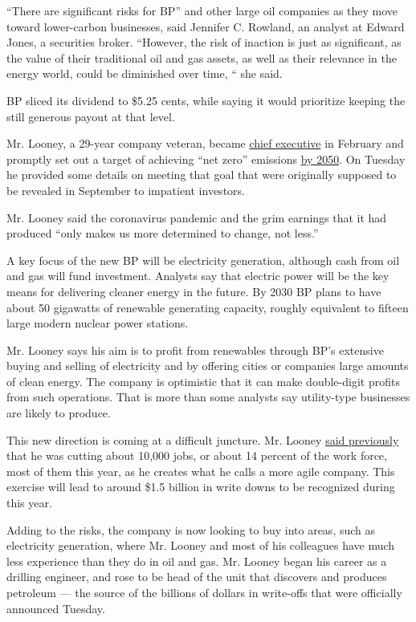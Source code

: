 ``There are significant risks for BP'' and other large oil companies as
they move toward lower-carbon businesses, said Jennifer C. Rowland, an
analyst at Edward Jones, a securities broker. ``However, the risk of
inaction is just as significant, as the value of their traditional oil
and gas assets, as well as their relevance in the energy world, could be
diminished over time, `` she said.

BP sliced its dividend to \$5.25 cents, while saying it would prioritize
keeping the still generous payout at that level.

Mr. Looney, a 29-year company veteran, became
\href{https://www.nytimes.com/2019/10/04/business/bp-ceo-bob-dudley-bernard-looney.html}{chief
executive} in February and promptly set out a target of achieving ``net
zero'' emissions
\href{https://www.nytimes.com/2020/02/12/climate/bp-greenhouse-gas-emissions.html}{by
2050}. On Tuesday he provided some details on meeting that goal that
were originally supposed to be revealed in September to impatient
investors.

Mr. Looney said the coronavirus pandemic and the grim earnings that it
had produced ``only makes us more determined to change, not less.''

A key focus of the new BP will be electricity generation, although cash
from oil and gas will fund investment. Analysts say that electric power
will be the key means for delivering cleaner energy in the future. By
2030 BP plans to have about 50 gigawatts of renewable generating
capacity, roughly equivalent to fifteen large modern nuclear power
stations.

Mr. Looney says his aim is to profit from renewables through BP's
extensive buying and selling of electricity and by offering cities or
companies large amounts of clean energy. The company is optimistic that
it can make double-digit profits from such operations. That is more than
some analysts say utility-type businesses are likely to produce.

This new direction is coming at a difficult juncture. Mr. Looney
\href{https://www.bbc.com/news/explainers-52966609}{said previously}
that he was cutting about 10,000 jobs, or about 14 percent of the work
force, most of them this year, as he creates what he calls a more agile
company. This exercise will lead to around \$1.5 billion in write downs
to be recognized during this year.

Adding to the risks, the company is now looking to buy into areas, such
as electricity generation, where Mr. Looney and most of his colleagues
have much less experience than they do in oil and gas. Mr. Looney began
his career as a drilling engineer, and rose to be head of the unit that
discovers and produces petroleum --- the source of the billions of
dollars in write-offs that were officially announced Tuesday.

